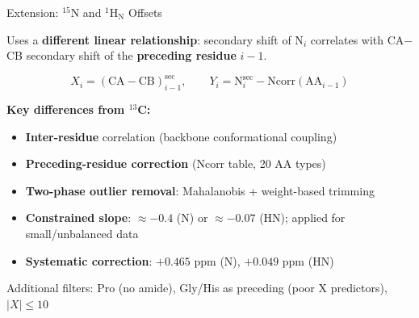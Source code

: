 \documentclass[aspectratio=169,11pt]{beamer}
\begin{document}
\begin{frame}[shrink=8]{Extension: ${}^{15}$N and ${}^{1}$H$_\text{N}$ Offsets}

Uses a \textbf{different linear relationship}: secondary shift of N$_i$ correlates with CA$-$CB secondary shift of the \textbf{preceding residue} $i{-}1$.

\[
  X_i = (\text{CA} - \text{CB})^{\text{sec}}_{i-1}, \qquad
  Y_i = \text{N}^{\text{sec}}_i - \text{Ncorr}(\text{AA}_{i-1})
\]

\smallskip
\textbf{Key differences from ${}^{13}$C:}
\begin{itemize}\setlength\itemsep{1pt}
  \item \textbf{Inter-residue} correlation (backbone conformational coupling)
  \item \textbf{Preceding-residue correction} (Ncorr table, 20 AA types)
  \item \textbf{Two-phase outlier removal}: Mahalanobis + weight-based trimming
  \item \textbf{Constrained slope}: ${\approx}{-0.4}$ (N) or ${\approx}{-0.07}$ (HN); applied for small/unbalanced data
  \item \textbf{Systematic correction}: $+0.465$ ppm (N), $+0.049$ ppm (HN)
\end{itemize}

\smallskip
\footnotesize
Additional filters: Pro (no amide), Gly/His as preceding (poor X predictors), $|X| \leq 10$
\end{frame}
\end{document}
